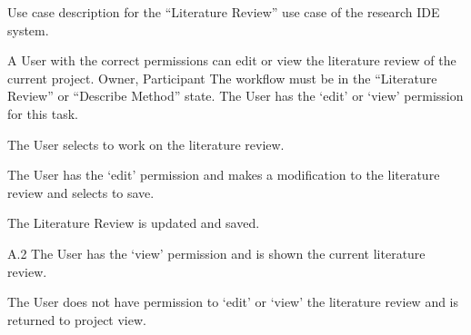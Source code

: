 \documentclass[document.tex]{subfiles}
\begin{document}
\begin{table}
  \centering
  \caption{Use case description for the ``Literature Review'' use case of the research IDE system.}
  \label{tbl:use-case-literature-review}

  \begin{usecase}
    A User with the correct permissions can edit or view the literature review of the current project.
    Owner, Participant
    The workflow must be in the “Literature Review” or “Describe Method” state. The User has the ‘edit’ or ‘view’ permission for this task.
    \ucnormal
    \begin{ucenum}
      \item The User selects to work on the literature review.
      \item The User has the ‘edit’ permission and makes a modification to the literature review and selects to save.
      \item The Literature Review is updated and saved.
    \end{ucenum}
    \begin{ucenum}
      \item [A.2] The User has the ‘view’ permission and is shown the current literature review.
    \end{ucenum}
    The User does not have permission to ‘edit’ or ‘view’ the literature review and is returned to project view.
  \end{usecase}
\end{table}
\end{document}
